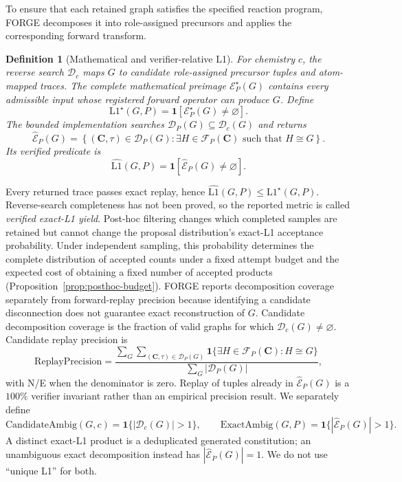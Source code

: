 \documentclass{article}
\newtheorem{definition}[theorem]{Definition}
\begin{document}
To ensure that each retained graph satisfies the specified reaction program, FORGE decomposes it
into role-assigned precursors and applies the corresponding forward transform.

\begin{definition}[Mathematical and verifier-relative L1]
For chemistry $c$, the reverse search $\mathcal D_c$ maps $G$ to candidate role-assigned precursor
tuples and atom-mapped traces. The complete mathematical preimage $\mathcal E_P^\star(G)$ contains
every admissible input whose registered forward operator can produce $G$. Define
\begin{equation}
    \mathrm{L1}^\star(G,P)
    =\mathbf 1\!\left[\mathcal E_P^\star(G)\neq\varnothing\right].
\end{equation}
The bounded implementation searches $\mathcal D_P(G)\subseteq\mathcal D_c(G)$ and returns
\begin{equation}
    \widehat{\mathcal E}_P(G)
    =
    \left\{
        (\mathbf C,\tau)\in\mathcal D_P(G):
        \exists H\in\mathcal F_P(\mathbf C)\text{ such that }H\cong G
    \right\}.
\end{equation}
Its verified predicate is
\begin{equation}
    \widehat{\mathrm{L1}}(G,P)
    = \mathbf{1}\!\left[
        \widehat{\mathcal E}_P(G)\neq\varnothing
    \right].
\end{equation}
\end{definition}
Every returned trace passes exact replay, hence
$\widehat{\mathrm{L1}}(G,P)\leq\mathrm{L1}^\star(G,P)$. Reverse-search completeness has not been
proved, so the reported metric is called \emph{verified exact-L1 yield}.
Post-hoc filtering changes which completed samples are retained but cannot change the proposal
distribution's exact-L1 acceptance probability.
Under independent sampling, this probability determines the complete distribution of accepted
counts under a fixed attempt budget and the expected cost of obtaining a fixed number of accepted
products (Proposition~\ref{prop:posthoc-budget}).
FORGE reports decomposition coverage separately from forward-replay precision because identifying a
candidate disconnection does not guarantee exact reconstruction of $G$.
Candidate decomposition coverage is the fraction of valid graphs for which
$\mathcal D_c(G)\neq\varnothing$. Candidate replay precision is
\begin{equation}
 \mathrm{ReplayPrecision}
 =\frac{\sum_G\sum_{(\mathbf C,\tau)\in\mathcal D_P(G)}
 \mathbf 1\{\exists H\in\mathcal F_P(\mathbf C):H\cong G\}}
 {\sum_G|\mathcal D_P(G)|},
\end{equation}
with N/E when the denominator is zero. Replay of tuples already in
$\widehat{\mathcal E}_P(G)$ is a $100\%$ verifier invariant rather than an empirical precision
result. We separately define
\begin{equation}
 \mathrm{CandidateAmbig}(G,c)=\mathbf 1\{|\mathcal D_c(G)|>1\},\qquad
 \mathrm{ExactAmbig}(G,P)=\mathbf 1\{|\widehat{\mathcal E}_P(G)|>1\}.
\end{equation}
A distinct exact-L1 product is a deduplicated generated constitution; an unambiguous exact
decomposition instead has $|\widehat{\mathcal E}_P(G)|=1$. We do not use ``unique L1'' for both.
\end{document}
